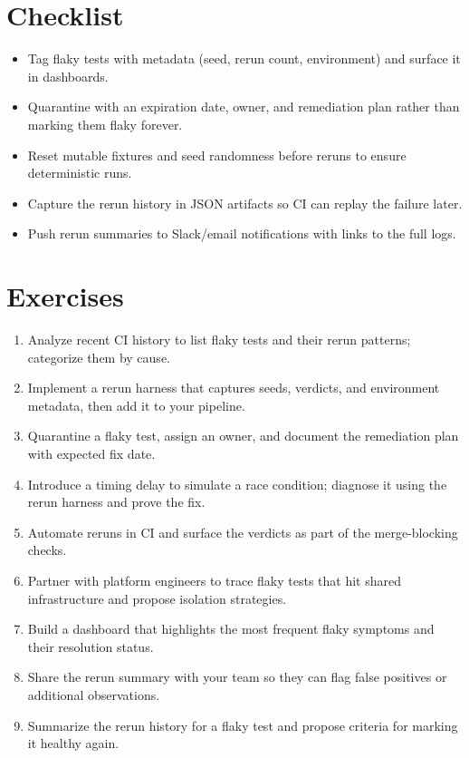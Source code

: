 \section{Checklist}
\begin{itemize}
  \item Tag flaky tests with metadata (seed, rerun count, environment) and surface it in dashboards.
  \item Quarantine with an expiration date, owner, and remediation plan rather than marking them flaky forever.
  \item Reset mutable fixtures and seed randomness before reruns to ensure deterministic runs.
  \item Capture the rerun history in JSON artifacts so CI can replay the failure later.
  \item Push rerun summaries to Slack/email notifications with links to the full logs.
\end{itemize}

\section{Exercises}
\begin{enumerate}
  \item Analyze recent CI history to list flaky tests and their rerun patterns; categorize them by cause.
  \item Implement a rerun harness that captures seeds, verdicts, and environment metadata, then add it to your pipeline.
  \item Quarantine a flaky test, assign an owner, and document the remediation plan with expected fix date.
  \item Introduce a timing delay to simulate a race condition; diagnose it using the rerun harness and prove the fix.
  \item Automate reruns in CI and surface the verdicts as part of the merge-blocking checks.
  \item Partner with platform engineers to trace flaky tests that hit shared infrastructure and propose isolation strategies.
  \item Build a dashboard that highlights the most frequent flaky symptoms and their resolution status.
  \item Share the rerun summary with your team so they can flag false positives or additional observations.
  \item Summarize the rerun history for a flaky test and propose criteria for marking it healthy again.
\end{enumerate}

